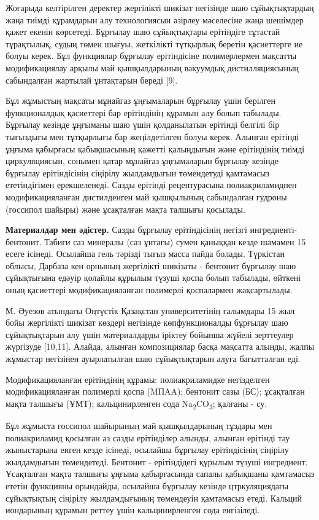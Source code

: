 \begin{multicols}{2}
Жоғарыда келтірілген деректер жергілікті шикізат негізінде шаю
сұйықтықтардың жаңа тиімді құрамдарын алу технологиясын әзірлеу
мәселесіне жаңа шешімдер қажет екенін көрсетеді. Бұрғылау шаю
сұйықтықтары ерітіндіге тұтастай тұрақтылық, судың төмен шығуы,
жеткілікті тұтқырлық беретін қасиеттерге ие болуы керек. Бұл функциялар
бұрғылау ерітіндісіне полимерлермен мақсатты модификациялау арқылы май
қышқылдарының вакуумдық дистилляциясының сабындалған жартылай ұнтақтарын
береді {[}9{]}.

Бұл жұмыстың мақсаты мұнайгаз ұңғымаларын бұрғылау үшін берілген
функционалдық қасиеттері бар ерітіндінің құрамын алу болып табылады.
Бұрғылау кезінде ұңғыманы шаю үшін қолданылатын ерітінді белгілі бір
тығыздығы мен тұтқырлығы бар жеңілдетілген болуы керек. Алынған ерітінді
ұңғыма қабырғасы қабықшасының қажетті қалыңдығын және ерітіндінің тиімді
циркуляциясын, сонымен қатар мұнайгаз ұңғымаларын бұрғылау кезінде
бұрғылау ерітіндісінің сіңірілу жылдамдығын төмендетуді қамтамасыз
ететіндігімен ерекшеленеді. Сазды ерітінді рецептурасына
полиакриламидпен модификацияланған дистилденген май қышқылының
сабындалған гудроны (госсипол шайыры) және ұсақталған мақта талшығы
қосылады.

{\bfseries Материалдар мен әдістер.} Сазды бұрғылау ерітіндісінің негізгі
ингредиенті-бентонит. Табиғи саз минералы (саз ұнтағы) сумен қаныққан
кезде шамамен 15 есеге ісінеді. Осылайша гель тәрізді тығыз масса пайда
болады. Түркістан облысы, Дарбаза кен орнының жергілікті шикізаты -
бентонит бұрғылау шаю сұйықтығына едәуір қолайлы құрылым түзуші қоспа
болып табылады, өйткені оның қасиеттері модификацияланған полимерлі
қоспалармен жақсартылады.

М. Әуезов атындағы Оңтүстік Қазақстан университетінің ғалымдары 15 жыл
бойы жергілікті шикізат көздері негізінде көпфункционалды бұрғылау шаю
сұйықтықтарын алу үшін материалдарды іріктеу бойынша жүйелі зерттеулер
жүргізуде {[}10,11{]}. Алайда, алынған композициялар басқа мақсатта
алынды, жалпы жұмыстар негізінен ауырлатылған шаю сұйықтықтарын алуға
бағытталған еді.

Модификацияланған ерітіндінің құрамы: полиакриламидке негізделген
модификацияланған полимерлі қоспа (MПAA); бентонит сазы (БС); ұсақталған
мақта талшығы (ҰМТ); кальцинирленген сода
Na\textsubscript{2}CO\textsubscript{3}; қалғаны - су.

Бұл жұмыста госсипол шайырының май қышқылдарының тұздары мен
полиакриламид қосылған аз сазды ерітінділер алынды, алынған ерітінді тау
жыныстарына енген кезде ісінеді, осылайша бұрғылау ерітіндісінің
сіңірілу жылдамдығын төмендетеді. Бентонит - ерітіндідегі құрылым түзуші
ингредиент. Ұсақталған мақта талшығы ұңғыма қабырғасында сапалы
қабықшаны қамтамасыз ететін функцияны орындайды, осылайша бұрғылау
кезінде цтркуляциядағы сұйықтықтың сіңірілу жылдамдығының төмендеуін
қамтамасыз етеді. Кальций иондарының құрамын реттеу үшін кальцинирленген
сода енгізіледі.


\end{multicols}
